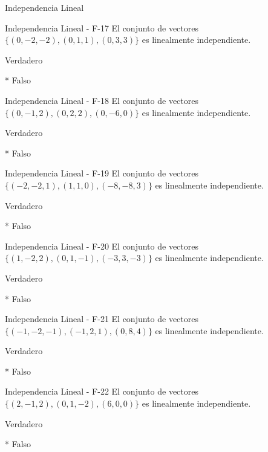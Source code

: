 \documentclass[a4,11pt]{aleph-notas}
\begin{document}
\begin{quiz}{Independencia Lineal}
\begin{multi}[numbering = none, shuffle = false]%
    {Independencia Lineal - F-17}
    El conjunto de vectores $\{ (0,-2,-2) , (0,1,1), (0, 3, 3) \}$ es linealmente independiente.
    \item[] Verdadero 
    \item[]* Falso
\end{multi}

\begin{multi}[numbering = none, shuffle = false]%
    {Independencia Lineal - F-18}
    El conjunto de vectores $\{ (0,-1,2) , (0,2,2), (0, -6, 0) \}$ es linealmente independiente.
    \item[] Verdadero 
    \item[]* Falso
\end{multi}

\begin{multi}[numbering = none, shuffle = false]%
    {Independencia Lineal - F-19}
    El conjunto de vectores $\{ (-2,-2,1) , (1,1,0), (-8, -8, 3) \}$ es linealmente independiente.
    \item[] Verdadero 
    \item[]* Falso
\end{multi}

\begin{multi}[numbering = none, shuffle = false]%
    {Independencia Lineal - F-20}
    El conjunto de vectores $\{ (1,-2,2) , (0,1,-1), (-3, 3, -3) \}$ es linealmente independiente.
    \item[] Verdadero 
    \item[]* Falso
\end{multi}

\begin{multi}[numbering = none, shuffle = false]%
    {Independencia Lineal - F-21}
    El conjunto de vectores $\{ (-1,-2,-1) , (-1,2,1), (0, 8, 4) \}$ es linealmente independiente.
    \item[] Verdadero 
    \item[]* Falso
\end{multi}

\begin{multi}[numbering = none, shuffle = false]%
    {Independencia Lineal - F-22}
    El conjunto de vectores $\{ (2,-1,2) , (0,1,-2), (6, 0, 0) \}$ es linealmente independiente.
    \item[] Verdadero 
    \item[]* Falso
\end{multi}


\end{quiz}
\end{document}

